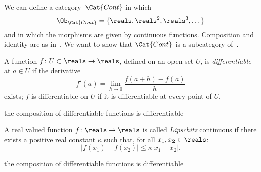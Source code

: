 {    \begin{example}
        We can define a category~$\Cat{Cont}$ in which~
        \begin{equation}
            \Ob_\Cat{Cont}=\{\reals, \reals^2, \reals^3, \dots \}
        \end{equation}
        and in which the morphisms are given by continuous functions.
        Composition and identity are as in~\Set.
        We want to show that $\Cat{Cont}$ is a subcategory of~\Set.
    \end{example}


    \begin{definition}
        A function $f\colon U\subset \reals\to \reals$, defined on an open set $U$, is \emph{differentiable} at $a\in U$ if the derivative
        \begin{equation}
            f'(a)=\lim_{h\to 0} \frac{f(a+h)-f(a)}{h}
        \end{equation}
        exists; $f$ is differentiable on $U$ if it is differentiable at every point of $U$.
    \end{definition}

    \begin{example}
        the composition of differentiable functions is differentiable
    \end{example}


    \begin{definition}
        A real valued function $f\colon \reals\to \reals$ is called \emph{Lipschitz} continuous if there exists a positive real constant $\kappa$ such that, for all $x_1,x_2\in \reals$:
        \begin{equation}
            \vert f(x_1)-f(x_2)\vert \leq \kappa \vert x_1-x_2\vert.
        \end{equation}
    \end{definition}

    \begin{example}
        the composition of differentiable functions is differentiable
    \end{example}


}
